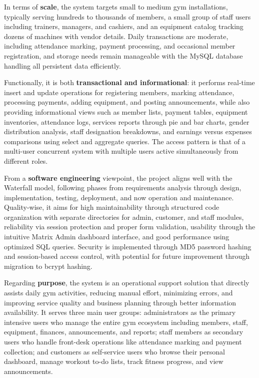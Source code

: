 \documentclass[12pt,a4paper]{report}
\begin{document}
In terms of \textbf{scale}, the system targets small to medium gym installations, typically serving hundreds to thousands of members, a small group of staff users including trainers, managers, and cashiers, and an equipment catalog tracking dozens of machines with vendor details. Daily transactions are moderate, including attendance marking, payment processing, and occasional member registration, and storage needs remain manageable with the MySQL database handling all persistent data efficiently.

Functionally, it is both \textbf{transactional and informational}: it performs real-time insert and update operations for registering members, marking attendance, processing payments, adding equipment, and posting announcements, while also providing informational views such as member lists, payment tables, equipment inventories, attendance logs, services reports through pie and bar charts, gender distribution analysis, staff designation breakdowns, and earnings versus expenses comparisons using select and aggregate queries. The access pattern is that of a multi-user concurrent system with multiple users active simultaneously from different roles.

From a \textbf{software engineering} viewpoint, the project aligns well with the Waterfall model, following phases from requirements analysis through design, implementation, testing, deployment, and now operation and maintenance. Quality-wise, it aims for high maintainability through structured code organization with separate directories for admin, customer, and staff modules, reliability via session protection and proper form validation, usability through the intuitive Matrix Admin dashboard interface, and good performance using optimized SQL queries. Security is implemented through MD5 password hashing and session-based access control, with potential for future improvement through migration to bcrypt hashing.

Regarding \textbf{purpose}, the system is an operational support solution that directly assists daily gym activities, reducing manual effort, minimizing errors, and improving service quality and business planning through better information availability. It serves three main user groups: administrators as the primary intensive users who manage the entire gym ecosystem including members, staff, equipment, finances, announcements, and reports; staff members as secondary users who handle front-desk operations like attendance marking and payment collection; and customers as self-service users who browse their personal dashboard, manage workout to-do lists, track fitness progress, and view announcements.
\end{document}
